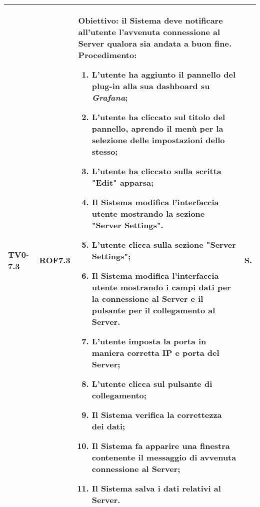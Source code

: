 \begin{longtable}{|C{.15\textwidth}|C{.13\textwidth}|m{.65\textwidth}|C{.08\textwidth}|}
TV0-7.3 & ROF7.3 &
	\textbf{Obiettivo}: il Sistema deve notificare all'utente l'avvenuta connessione al Server qualora sia andata a buon fine. \newline
	\textbf{Procedimento}:
	\begin{enumerate}
		\item L'utente ha aggiunto il pannello del plug-in alla sua dashboard su \textit{Grafana};
		\item L'utente ha cliccato sul titolo del pannello, aprendo il menù per la selezione delle impostazioni dello stesso;
		\item L'utente ha cliccato sulla scritta "Edit" apparsa;
		\item Il Sistema modifica l'interfaccia utente mostrando la sezione "Server Settings".
		\item L'utente clicca sulla sezione "Server Settings";
		\item Il Sistema modifica l'interfaccia utente mostrando i campi dati per la connessione al Server e il pulsante per il collegamento al Server.
		\item L'utente imposta la porta in maniera corretta IP e porta del Server;
		\item L'utente clicca sul pulsante di collegamento;
		\item Il Sistema verifica la correttezza dei dati;
		\item Il Sistema fa apparire una finestra contenente il messaggio di avvenuta connessione al Server;
		\item Il Sistema salva i dati relativi al Server.
	\end{enumerate}
	& S. \\
\hline


\end{longtable}
